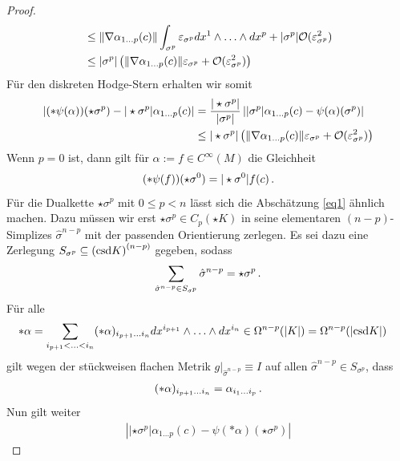 \begin{proof}
\begin{align}
      &\le \|\nabla\alpha_{1 \ldots p}(c)\| \int_{\sigma^{p}} \varepsilon_{\sigma^{p}}  dx^{1}\wedge\ldots\wedge dx^{p} +|\sigma^{p}| \mathcal{O}(\varepsilon_{\sigma^{p}}^{2}) \\
      &\le |\sigma^{p}| \left( \|\nabla\alpha_{1 \ldots p}(c)\| \varepsilon_{\sigma^{p}} + \mathcal{O}(\varepsilon_{\sigma^{p}}^{2}) \right) \label{eq1}
    \end{align}
    Für den diskreten Hodge-Stern erhalten wir somit
    \begin{align}
      \left| (*\psi(\alpha))(\star\sigma^{p}) - |\star\sigma^{p}|\alpha_{1 \ldots p}(c) \right|
            &= \frac{|\star\sigma^{p}|}{|\sigma^{p}|} \left| |\sigma^{p}|\alpha_{1 \ldots p}(c) - \psi(\alpha)(\sigma^{p}) \right| \\
            &\le  |\star\sigma^{p}| \left( \|\nabla\alpha_{1 \ldots p}(c)\| \varepsilon_{\sigma^{p}} + \mathcal{O}(\varepsilon_{\sigma^{p}}^{2}) \right)
    \end{align}
    Wenn \( p = 0 \) ist, dann gilt für \( \alpha:= f \in C^{\infty}(M) \) die Gleichheit
    \begin{align}
      (*\psi(f))(\star\sigma^{0}) = |\star\sigma^{0}|f(c) \,\text{.}
    \end{align}
    Für die Dualkette \( \star\sigma^{p} \) mit \( 0\le p < n \) lässt sich die Abschätzung \eqref{eq1} ähnlich machen.
    Dazu müssen wir erst \( \star\sigma^{p}\in C_{p}(\star K) \) in seine elementaren \( (n-p) \)-Simplizes \( \hat\sigma^{n-p} \) mit der passenden Orientierung zerlegen.
    Es sei dazu eine Zerlegung \(  S_{\sigma^{p}} \subseteq \left( \text{csd} K \right)^{(n-p)} \) gegeben, sodass
    \begin{align}
      \sum_{\hat\sigma^{n-p} \in S_{\sigma^{p}}} \hat\sigma^{n-p} = \star\sigma^{p}
      \,\text{.}
    \end{align}
    Für alle
    \begin{align}
      *\alpha&= \sum_{i_{p+1}<\ldots<i_{n}} (*\alpha)_{i_{p+1}\ldots i_{n}} dx^{i_{p+1}}\wedge\ldots\wedge dx^{i_{n}} \in\Omega^{n-p}(|K|)=\Omega^{n-p}(|\text{csd} K|)
    \end{align}
    gilt wegen der stückweisen flachen Metrik \( g|_{\hat\sigma^{n-p}} \equiv I \) auf allen \( \hat\sigma^{n-p} \in S_{\sigma^{p}} \), dass
    \begin{align}
      (*\alpha)_{i_{p+1}\ldots i_{n}} = \alpha_{i_{1}\ldots i_{p}} \,\text{.}
    \end{align}
    Nun gilt weiter
    \begin{align}
      \left| |\star\sigma^{p}|\alpha_{1 \ldots p}(c) - \psi(*\alpha)(\star\sigma^{p})\right| 

\end{align}
\end{proof}
